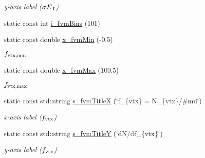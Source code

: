 \begin{CompactItemize}
\begin{CompactList}\small\item\em y-axis label ($\sigma E_{\rm T}$) \item\end{CompactList}\item 
\hypertarget{namespaceHistGroupCfg_4c1b93f18ca9e85d33f52ead6627bf57}{
static const int \hyperlink{namespaceHistGroupCfg_4c1b93f18ca9e85d33f52ead6627bf57}{i\_\-fvm\-Bins} (101)}
\label{namespaceHistGroupCfg_4c1b93f18ca9e85d33f52ead6627bf57}

\begin{CompactList}\small\item\em $N_{\rm bin}(f_{\rm vtx}}$, with $f_{\rm vtx} = \frac{N_{\rm vtx}}{\mu}$ \item\end{CompactList}\item 
\hypertarget{namespaceHistGroupCfg_98ecfd5f134ab1699f23ca1e60b1747b}{
static const double \hyperlink{namespaceHistGroupCfg_98ecfd5f134ab1699f23ca1e60b1747b}{x\_\-fvm\-Min} (-0.5)}
\label{namespaceHistGroupCfg_98ecfd5f134ab1699f23ca1e60b1747b}

\begin{CompactList}\small\item\em $f_{\rm vtx,min}$ \item\end{CompactList}\item 
\hypertarget{namespaceHistGroupCfg_422a6894498f20cbad8e9a7aca4ec720}{
static const double \hyperlink{namespaceHistGroupCfg_422a6894498f20cbad8e9a7aca4ec720}{x\_\-fvm\-Max} (100.5)}
\label{namespaceHistGroupCfg_422a6894498f20cbad8e9a7aca4ec720}

\begin{CompactList}\small\item\em $f_{\rm vtx,max}$ \item\end{CompactList}\item 
\hypertarget{namespaceHistGroupCfg_46e7575fe825d0bbf7d0f37e80b4dcb5}{
static const std::string \hyperlink{namespaceHistGroupCfg_46e7575fe825d0bbf7d0f37e80b4dcb5}{s\_\-fvm\-Title\-X} (\char`\"{}f\_\-\{vtx\} = N\_\-\{vtx\}/\#mu\char`\"{})}
\label{namespaceHistGroupCfg_46e7575fe825d0bbf7d0f37e80b4dcb5}

\begin{CompactList}\small\item\em x-axis label ($f_{\rm vtx}$) \item\end{CompactList}\item 
\hypertarget{namespaceHistGroupCfg_d68f35b8f4108d488ddadaf34dcfe234}{
static const std::string \hyperlink{namespaceHistGroupCfg_d68f35b8f4108d488ddadaf34dcfe234}{s\_\-fvm\-Title\-Y} (\char`\"{}d\-N/df\_\-\{vtx\}\char`\"{})}
\label{namespaceHistGroupCfg_d68f35b8f4108d488ddadaf34dcfe234}

\begin{CompactList}\small\item\em y-axis label ($f_{\rm vtx}$) \item\end{CompactList}\end{CompactItemize}
